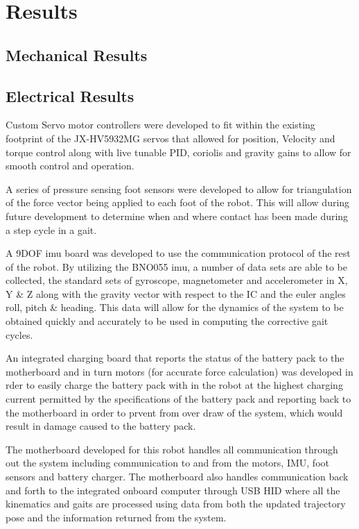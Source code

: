 \section{Results}
\subsection{Mechanical Results}

\subsection{Electrical Results}
Custom Servo motor controllers were developed to fit within the existing footprint of the JX-HV5932MG servos that allowed for position, Velocity and torque control along with live tunable PID, coriolis and gravity gains to allow for smooth control and operation. 

A series of pressure sensing foot sensors were developed to allow for triangulation of the force vector being applied to each foot of the robot. This will allow during future development to determine when and where contact has been made during a step cycle in a gait.

A 9DOF imu board was developed to use the communication protocol of the rest of the robot. By utilizing the BNO055 imu, a number of data sets are able to be collected, the standard sets of gyroscope, magnetometer and accelerometer in X, Y \& Z along with the gravity vector with respect to the IC and the euler angles roll, pitch \& heading. This data will allow for the dynamics of the system to be obtained quickly and accurately to be used in computing the corrective gait cycles.

An integrated charging board that reports the status of the battery pack to the motherboard and in turn motors (for accurate force calculation) was developed in rder to easily charge the battery pack with in the robot at the highest charging current permitted by the specifications of the battery pack and reporting back to the motherboard in order to prvent from over draw of the system, which would result in damage caused to the battery pack. 

The motherboard developed for this robot handles all communication through out the system including communication to and from the motors, IMU, foot sensors and battery charger. The motherboard also handles communication back and forth to the integrated onboard computer through USB HID where all the kinematics and gaits are processed using data from both the updated trajectory pose and the information returned from the system. 

